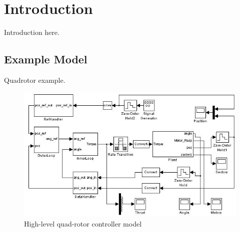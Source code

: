 \section{Introduction}

Introduction here.




\subsection{Example Model}

Quadrotor example.

\begin{figure}[h]
\centering
\includegraphics[width=\columnwidth]{figures/quad_rotor.jpg}
    \caption{High-level quad-rotor controller model}
    \label{fig:quad_rotor_model}
\end{figure}